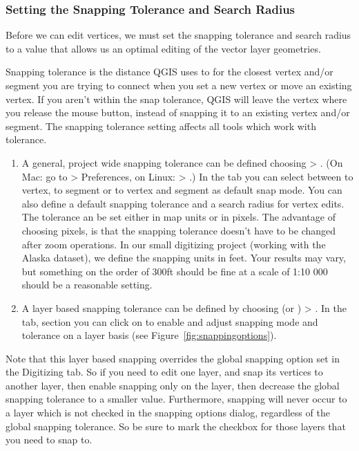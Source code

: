 \subsubsection{Setting the Snapping Tolerance and Search Radius}\label{snapping_tolerance}

Before we can edit vertices, we must set the snapping
tolerance and search radius to a value that allows us an optimal editing of
the vector layer geometries. 


Snapping tolerance is the distance QGIS uses to  for the
closest vertex and/or segment you are trying to
connect when you set a new vertex or move an existing vertex. If you aren't
within the snap tolerance, QGIS will leave the vertex where you release the
mouse button, instead of snapping it to an existing vertex and/or segment. 
The snapping tolerance setting affects all tools which work with tolerance. 

\begin{enumerate}
\item A general, project wide snapping tolerance can be defined choosing
 > . 
(On Mac: go to   > Preferences, on Linux:  > .)
In the  tab you can select between to vertex, to segment or
to vertex and segment as default snap mode. You can also define a default
snapping tolerance and a search radius for vertex edits. The tolerance an be 
set either in map units or in pixels. The advantage of choosing pixels, is 
that the snapping tolerance doesn't have to be changed after zoom operations. 
In our small digitizing project (working with the Alaska dataset), we define 
the snapping units in feet. Your results may vary, but something on the order 
of 300ft should be fine at a scale of 1:10 000 should be a reasonable 
setting.
\item A layer based snapping tolerance can be defined by choosing
 (or ) > . In the  tab, section  you
can click on  to enable and adjust snapping
mode and tolerance on a layer basis (see Figure~\ref{fig:snappingoptions}).
\end{enumerate}
Note that this layer based snapping overrides the global snapping option set in the Digitizing tab. So if you need to edit one layer, and snap its vertices to another layer, then enable snapping only on the  layer, then decrease the global snapping tolerance to a smaller value.  Furthermore, snapping will never occur to a layer which is not checked in the snapping options dialog, regardless of the global snapping tolerance. So be sure to mark the checkbox for those layers that you need to snap to.


